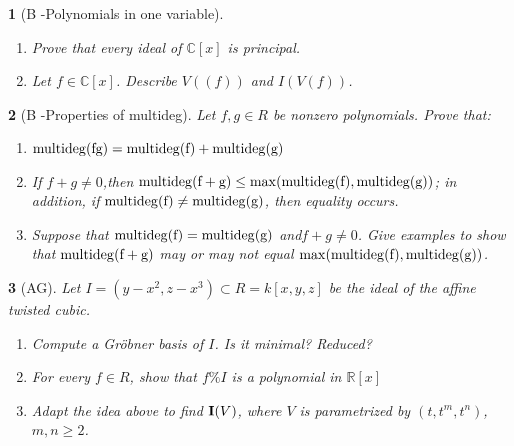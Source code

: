 \documentclass[11pt]{article}
\theoremstyle{problem}
\newtheorem{p}{}
\newcommand{\CC}{\mathbb{C}}
\newcommand{\RR}{\mathbb{R}}
\newcommand{\GB}{Gr\"obner basis }
\newcommand{\I}{{\bf I}}
\newcommand{\md}{\rm{multideg}}
\newcommand{\multideg}{\rm{multideg}}
\begin{document}
\pagestyle{empty}

\thispagestyle{myheadings}


\bigskip 

\bigskip 

\bigskip 

\begin{p} [B -Polynomials in one variable]
\begin{enumerate}
\item Prove that every ideal of $\CC[x]$ is principal.
\item Let $f\in \CC[x]$. Describe $V((f))$ and $I(V(f))$.
\end{enumerate}
\end{p}



\begin{p} [B -Properties of \md]
Let $f,g\in R$ be nonzero polynomials. Prove that:
\begin{enumerate}
\item $\md(fg) = \md(f) + \md(g)$
\item If $ f + g \neq 0$,then $\md(f + g) \leq \max(\md(f), \md(g))$; in addition, if $\md(f) \neq \md(g)$, then equality occurs.
\item Suppose that $\multideg(f) = \multideg(g)$ and$f+g\neq0$. Give examples to show that
$\multideg(f + g)$ may or may not equal $\max(\multideg(f), \multideg(g))$.
\end{enumerate}
\end{p}






 \begin{p} [AG]
 Let $I=(y-x^2,z-x^3)\subset R=k[x,y,z]$ be the ideal of the affine twisted cubic.
 \begin{enumerate}
\item Compute a \GB of $I$. Is it minimal? Reduced?
\item For every $f\in R$, show that $f\%I$ is a polynomial in $\RR[x]$
\item Adapt the idea above to find $\I(V)$, where $V$ is parametrized by $(t,t^m,t^n)$, $m,n\geq 2$.
\end{enumerate}
\end{p}
\end{document}
